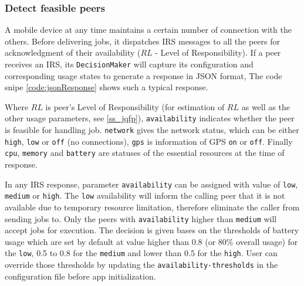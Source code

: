 \documentclass[conference]{IEEEtran}
\begin{document}
\subsubsection{Detect feasible peers}\label{ss_dfp}

A mobile device at any time maintains a certain number of connection with the others. Before delivering jobs, it dispatches IRS messages to all the peers for acknowledgment of their availability ($RL$ - Level of Responsibility). If a peer receives an IRS, its \texttt{DecisionMaker} will capture its configuration and corresponding usage states to generate a response in JSON format, The code snipe \ref{code:jsonResponse} shows such a typical response.\\

\noindent {}	

Where $RL$ is peer's Level of Responsibility (for estimation of $RL$ as well as the other usage parameters, see \ref{ss_jqfp}), \texttt{availability} indicates whether the peer is feasible for handling job. \texttt{network} gives the network status, which can be either \texttt{high}, \texttt{low} or \texttt{off} (no connections), \texttt{gps} is information of GPS \texttt{on} or \texttt{off}. Finally \texttt{cpu}, \texttt{memory} and \texttt{battery} are statuses of the essential resources at the time of response. 

In any IRS response, parameter \texttt{availability} can be assigned with value of \texttt{low}, \texttt{medium} or \texttt{high}. The \texttt{low} availability will inform the calling peer that it is not available due to temporary resource limitation, therefore eliminate the caller from sending jobs to. Only the peers with \texttt{availability} higher than \texttt{medium} will accept jobs for execution. The decision is given bases on the thresholds of battery usage which are set by default at value higher than 0.8 (or 80\% overall usage) for the \texttt{low}, 0.5 to 0.8 for the \texttt{medium} and lower than 0.5 for the \texttt{high}. User can override those thresholds by updating the \texttt{availability-thresholds} in the configuration file before app initialization. 
\end{document}
